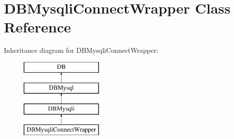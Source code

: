 \hypertarget{classDBMysqliConnectWrapper}{\section{D\+B\+Mysqli\+Connect\+Wrapper Class Reference}
\label{classDBMysqliConnectWrapper}
}


 


Inheritance diagram for D\+B\+Mysqli\+Connect\+Wrapper\+:\begin{figure}[H]
\begin{center}
\leavevmode
\includegraphics[height=4.000000cm]{classDBMysqliConnectWrapper}
\end{center}
\end{figure}
